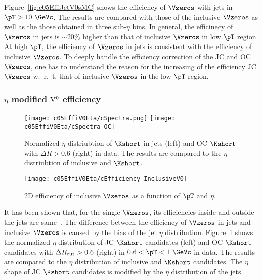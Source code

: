 Figure~\ref{fig:c05EffiJetV0sMC} shows the efficiency of $\Vzeros$ with jets
in $\pT>10~\GeVc$.
The results are compared with those of the inclusive $\Vzeros$ as well as
the those obtained in three sub-$\eta$ bins.
In general, the efficinecy of $\Vzeros$ in jets is $\sim 20\%$ higher than
that of inclusive $\Vzeros$ in low $\pT$ region.
At high $\pT$, the efficiency of $\Vzeros$ in jets is consistent with
the efficiency of inclusive $\Vzeros$.
To deeply handle the efficiency correction of the JC and OC $\Vzeros$,
one has to understand the reason for the increasing of the efficiency
JC $\Vzeros$ w.~r.~t. that of inclusive $\Vzeros$ in the low $\pT$ region.

\subsubsection{$\eta$ modified ${\rm V}^{0}$ efficiency}
\label{sec:c05ScaledV0Effi}

\begin{figure}[htb]
\begin{center}
\texttt{[image: c05EffiV0Eta/cSpectra.png]}
\texttt{[image: c05EffiV0Eta/cSpectra\_OC]}
\caption{Normalized $\eta$ distriubtion of $\Kshort$ in jets (left)
         and OC $\Kshort$ with $\Delta R>0.6$ (right) in data.
         The results are compared to the $\eta$ distriubtion of 
         inclusive and $\Kshort$.}
\label{fig:c05EffiJetV0Wgt}
\end{center}
\end{figure}

\begin{figure}[htb]
\begin{center}
\texttt{[image: c05EffiV0Eta/cEfficiency\_InclusiveV0]}
\caption{2D efficiency of inclusive $\Vzeros$ as a function of $\pT$
         and $\eta$.}
\label{fig:c05EffiIncV02D}
\end{center}
\end{figure}

It has been shown that,
for the single $\Vzeros$, its efficiencies inside and outside the jets are
same~\cite{Kucera:AliPWGJE20140328}.
The difference between the efficiency of $\Vzeros$ in jets and
inclusive $\Vzeros$ is caused by the bias of the jet $\eta$ distribution.
Figure~\ref{fig:c05EffiJetV0Wgt} shows the normalized $\eta$ distribution
of JC $\Kshort$ candidates (left) and OC $\Kshort$ candidates
with $\Delta R_{\rm cut}>0.6$ (right) in $0.6<\pT<1~\GeVc$ in data.
The results are compared to the $\eta$ distribution of inclusive
and $\Kshort$ candidates.
The $\eta$ shape of JC $\Kshort$ candidates is modified by
the $\eta$ distribution of the jets.

